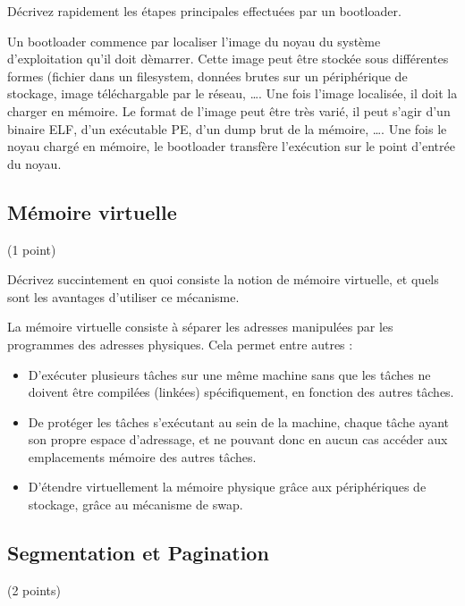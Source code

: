 D\'ecrivez rapidement les \'etapes principales effectu\'ees par un bootloader.

\begin{correction}

Un bootloader commence par localiser l'image du noyau du syst\`eme
d'exploitation qu'il doit d\`emarrer. Cette image peut \^etre stock\'ee sous
diff\'erentes formes (fichier dans un filesystem, donn\'ees brutes sur un
p\'eriph\'erique de stockage, image t\'el\'echargable par le r\'eseau, \ldots.
Une fois l'image localis\'ee, il doit la charger en m\'emoire. Le format de
l'image peut \^etre tr\`es vari\'e, il peut s'agir d'un binaire ELF, d'un
ex\'ecutable PE, d'un dump brut de la m\'emoire, \ldots.
Une fois le noyau charg\'e en m\'emoire, le bootloader transf\`ere
l'ex\'ecution sur le point d'entr\'ee du noyau.

\end{correction}

\subsection{M\'emoire virtuelle} (1 point)

D\'ecrivez succintement en quoi consiste la notion de m\'emoire virtuelle, et
quels sont les avantages d'utiliser ce m\'ecanisme.

\begin{correction}

La m\'emoire virtuelle consiste \`a s\'eparer les adresses manipul\'ees par les
programmes des adresses physiques. Cela permet entre autres :
\begin{itemize}
\item D'ex\'ecuter plusieurs t\^aches sur une m\^eme machine sans que les
t\^aches ne doivent \^etre compil\'ees (link\'ees) sp\'ecifiquement, en
fonction des autres t\^aches.
\item De prot\'eger les t\^aches s'ex\'ecutant au sein de la machine, chaque
t\^ache ayant son propre espace d'adressage, et ne pouvant donc en aucun cas
acc\'eder aux emplacements m\'emoire des autres t\^aches.
\item D'\'etendre virtuellement la m\'emoire physique gr\^ace aux
p\'eriph\'eriques de stockage, gr\^ace au m\'ecanisme de swap.
\end{itemize}

\end{correction}

\subsection{Segmentation et Pagination} (2 points)

